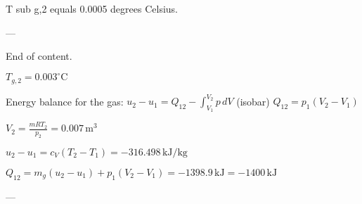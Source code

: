 T sub g,2 equals 0.0005 degrees Celsius.  

---

End of content.

\( T_{g,2} = 0.003^\circ \text{C} \)  

Energy balance for the gas:  
\( u_2 - u_1 = Q_{12} - \int_{V_1}^{V_2} p \, dV \) (isobar)  
\( Q_{12} = p_1 (V_2 - V_1) \)  

\( V_2 = \frac{mRT_2}{p_2} = 0.007 \, \text{m}^3 \)  

\( u_2 - u_1 = c_V (T_2 - T_1) = -316.498 \, \text{kJ/kg} \)  

\( Q_{12} = m_g (u_2 - u_1) + p_1 (V_2 - V_1) = -1398.9 \, \text{kJ} = -1400 \, \text{kJ} \)  

---